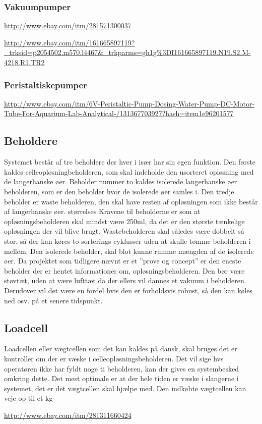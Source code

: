 \subsubsection{Vakuumpumper}
\url{ http://www.ebay.com/itm/281571300037}

\url{http://www.ebay.com/itm/161665897119?_trksid=p2054502.m570.l4467&_trkparms=gh1g%3DI161665897119.N19.S2.M-4218.R1.TR2}

\subsubsection{Peristaltiskepumper}

\url{http://www.ebay.com/itm/6V-Peristaltic-Pump-Dosing-Water-Pump-DC-Motor-Tube-For-Aquarium-Lab-Analytical-/131367703927?hash=item1e96201577}

\subsection{Beholdere}
Systemet består af tre beholdere der hver i især har sin egen funktion. Den første kaldes celleopløsningbeholderen, som skal indeholde den usorteret opløsning med de langerhanske øer. Beholder nummer to kaldes isolerede langerhanske øer beholderen, som er den beholder hvor de isolerede øer samles i. Den tredje beholder er waste beholderen, den skal have resten af opløsningen som ikke består af langerhanske øer. størrelses Kravene til beholderne er som at opløsningsbeholderen skal mindst være 250ml, da det er den største tænkelige opløsningen der vil blive brugt. Wastebeholderen skal således være dobbelt så stor, så der kan køres to sorterings cyklusser uden at skulle tømme beholderen i mellem. Den isolerede beholder, skal blot kunne rumme mængden af de isolerede øer. Da projektet som tidligere nævnt er et ”prove og concept” er den eneste beholder der er hentet informationer om, opløsningsbeholderen. Den bør være støvtæt, uden at være lufttæt da der ellers vil dannes et vakuum i beholderen. Derudover vil det være en fordel hvis den er forholdsvis robust, så den kan køles ned osv. på et senere tidspunkt.

\subsection{Loadcell}
Loadcellen eller vægtcellen som det kan kaldes på dansk, skal bruges det er kontroller om der er væske i celleopløsningsbeholderen. Det vil sige hvs operatøren ikke har fyldt noge ti beholderen, kan der gives en systembesked omkring dette. Det mest optimale er at der hele tiden er væske i slangerne i systemet, det er det vægtcellen skal hjælpe med. Den indkøbte vægtcellen kan veje op til et kg

\url{http://www.ebay.com/itm/281311660424}


